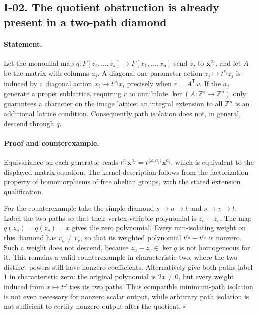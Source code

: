 \documentclass[11pt,a4paper]{article}
\theoremstyle{definition}\newtheorem{definition}{Definition}
\begin{document}
\subsection{I-02. The quotient obstruction is already present in a two-path diamond}
\label{I-02}

\paragraph{Statement.}
Let the monomial map $q:F[z_1,\ldots,z_s]\longrightarrow
F[x_1,\ldots,x_n]$ send $z_j$ to $\mathbf x^{a_j}$, and let $A$ be
the matrix with columns $a_j$.  A diagonal one-parameter action
$z_j\mapsto t^{r_j}z_j$ is induced by a diagonal action
$x_i\mapsto t^{\omega_i}x_i$ precisely when
$r=A^{\mathsf T}\omega$.  If the $a_j$ generate a proper sublattice,
requiring $r$ to annihilate $\ker(A:\mathbb Z^s\to\mathbb Z^n)$
only guarantees a character on the image lattice; an integral
extension to all $\mathbb Z^n$ is an additional lattice condition.
Consequently path isolation does not, in general, descend through $q$.

\paragraph{Proof and counterexample.}
Equivariance on each generator reads
$t^{r_j}\mathbf x^{a_j}=t^{\langle\omega,a_j\rangle}\mathbf x^{a_j}$,
which is equivalent to the displayed matrix equation.  The kernel
description follows from the factorization property of homomorphisms
of free abelian groups, with the stated extension qualification.

For the counterexample take the simple diamond
$s\to u\to t$ and $s\to v\to t$.  Label the two paths so that their
vertex-variable polynomial is $z_u-z_v$.  The map $q(z_u)=q(z_v)=x$
gives the zero polynomial.  Every min-isolating weight on this diamond
has $r_u\ne r_v$, so that its weighted polynomial
$t^{r_u}-t^{r_v}$ is nonzero.  Such a weight does not descend, because
$z_u-z_v\in\ker q$ is not homogeneous for it.  This remains a valid
counterexample in characteristic two, where the two distinct powers
still have nonzero coefficients.  Alternatively give both paths label
$1$ in characteristic zero: the original polynomial is $2x\ne0$,
but every weight induced from $x\mapsto t^{\omega}$ ties its two paths.
Thus compatible minimum-path isolation is not even necessary for
nonzero scalar output, while arbitrary path isolation is not sufficient
to certify nonzero output after the quotient. \hfill$\square$
\end{document}
